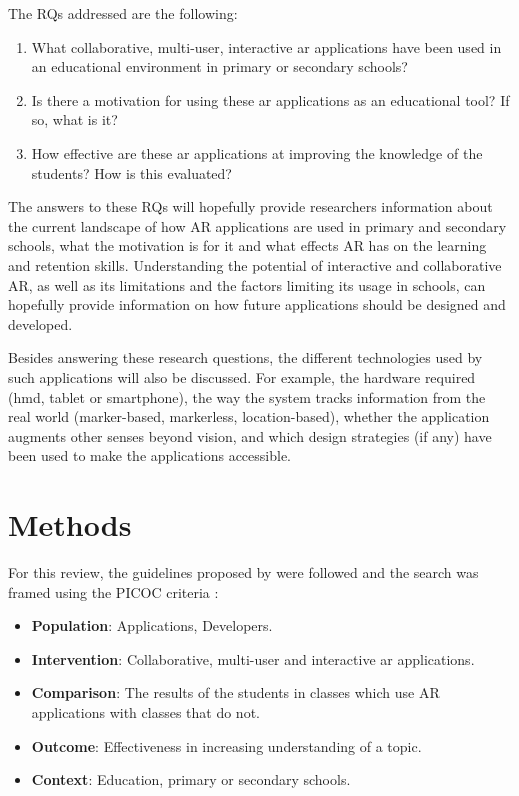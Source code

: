 The \glspl{RQ} addressed are the following:
\begin{enumerate}[start=1,label={\bfseries RQ\arabic*:}]
    \item What collaborative, multi-user, interactive \gls{ar} applications have been used in an educational environment in primary or secondary schools?
    \item Is there a motivation for using these \gls{ar} applications as an educational tool? If so, what is it?
    \item How effective are these \gls{ar} applications at improving the knowledge of the students? How is this evaluated?
\end{enumerate}

The answers to these RQs will hopefully provide researchers information about the current landscape of how AR applications are used in primary and secondary schools, what  the motivation is for it and what effects AR has on the learning and retention skills. Understanding the potential of interactive and collaborative AR, as well as its limitations and the factors limiting its usage in schools, can hopefully provide information on how future applications should be designed and developed.

Besides answering these research questions, the different technologies used by such applications will also be discussed. For example, the hardware required (\gls{hmd}, tablet or smartphone), the way the system tracks information from the real world (marker-based, markerless, location-based), whether the application augments other senses beyond vision, and which design strategies (if any) have been used to make the applications accessible.

\section{Methods}\label{sota:methods}
For this review, the guidelines proposed by \cite{kitchenham2009systematic} were followed and the search was framed using the PICOC criteria \citep{petticrew2008systematic}:
\begin{itemize}
    \item \textbf{Population}: Applications, Developers.
    \item \textbf{Intervention}: Collaborative, multi-user and interactive \gls{ar} applications.
    \item \textbf{Comparison}: The results of the students in classes which use AR applications with classes that do not.
    \item \textbf{Outcome}: Effectiveness in increasing understanding of a topic.
    \item \textbf{Context}: Education, primary or secondary schools.
\end{itemize}

